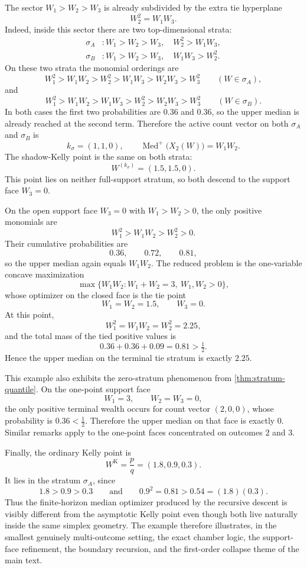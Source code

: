\documentclass[11pt]{article}
\theoremstyle{definition}
\newcommand{\1}{\mathbf{1}}
\newcommand{\Med}{\operatorname{Med}}
\begin{document}
The sector $W_1>W_2>W_3$ is already subdivided by the extra tie hyperplane
\[
W_2^2=W_1W_3.
\]
Indeed, inside this sector there are two top-dimensional strata:
\begin{align*}
\sigma_A &: W_1>W_2>W_3,\quad W_2^2>W_1W_3,\\
\sigma_B &: W_1>W_2>W_3,\quad W_1W_3>W_2^2.
\end{align*}
On these two strata the monomial orderings are
\[
W_1^2>W_1W_2>W_2^2>W_1W_3>W_2W_3>W_3^2
\qquad (W\in\sigma_A),
\]
and
\[
W_1^2>W_1W_2>W_1W_3>W_2^2>W_2W_3>W_3^2
\qquad (W\in\sigma_B).
\]
In both cases the first two probabilities are $0.36$ and $0.36$, so the upper median is already reached at the second term. Therefore the active count vector on both $\sigma_A$ and $\sigma_B$ is
\[
k_\sigma=(1,1,0),
\qquad
\Med^+\bigl(X_2(W)\bigr)=W_1W_2.
\]
The shadow-Kelly point is the same on both strata:
\[
W^{(k_\sigma)}=(1.5,1.5,0).
\]
This point lies on neither full-support stratum, so both descend to the support face $W_3=0$.

On the open support face $W_3=0$ with $W_1>W_2>0$, the only positive monomials are
\[
W_1^2>W_1W_2>W_2^2>0.
\]
Their cumulative probabilities are
\[
0.36,
\qquad
0.72,
\qquad
0.81,
\]
so the upper median again equals $W_1W_2$. The reduced problem is the one-variable concave maximization
\[
\max\{W_1W_2: W_1+W_2=3,\ W_1,W_2>0\},
\]
whose optimizer on the closed face is the tie point
\[
W_1=W_2=1.5,
\qquad
W_3=0.
\]
At this point,
\[
W_1^2=W_1W_2=W_2^2=2.25,
\]
and the total mass of the tied positive values is
\[
0.36+0.36+0.09=0.81>\tfrac12.
\]
Hence the upper median on the terminal tie stratum is exactly $2.25$.

This example also exhibits the zero-stratum phenomenon from \cref{thm:stratum-quantile}. On the one-point support face
\[
W_1=3,
\qquad
W_2=W_3=0,
\]
the only positive terminal wealth occurs for count vector $(2,0,0)$, whose probability is $0.36<\tfrac12$. Therefore the upper median on that face is exactly $0$. Similar remarks apply to the one-point faces concentrated on outcomes $2$ and $3$.

Finally, the ordinary Kelly point is
\[
W^{\mathrm K}=\frac{p}{q}=(1.8,0.9,0.3).
\]
It lies in the stratum $\sigma_A$, since
\[
1.8>0.9>0.3
\qquad\text{and}\qquad
0.9^2=0.81>0.54=(1.8)(0.3).
\]
Thus the finite-horizon median optimizer produced by the recursive descent is visibly different from the asymptotic Kelly point even though both live naturally inside the same simplex geometry. The example therefore illustrates, in the smallest genuinely multi-outcome setting, the exact chamber logic, the support-face refinement, the boundary recursion, and the first-order collapse theme of the main text.
\end{document}
